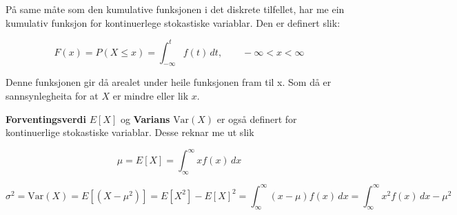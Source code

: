 På same måte som den kumulative funksjonen i det diskrete tilfellet, har me ein kumulativ funksjon for kontinuerlege stokastiske variablar. Den er definert slik:

\begin{equation}
    F(x) = P(X \leq x) = \int_{-\infty}^{t} f(t) \, dt, \qquad -\infty < x < \infty
\end{equation}

Denne funksjonen gir då arealet under heile funksjonen fram til x. Som då er sannsynlegheita for at $X$ er mindre eller lik $x$.

\textbf{Forventingsverdi} $E[X]$ og \textbf{Varians} $\text{Var}(X)$ er også definert for kontinuerlige stokastiske variablar. Desse reknar me ut slik

\begin{equation}
    \mu = E[X] = \int_{\infty}^{\infty} xf(x) \, dx
\end{equation}

\begin{equation}
    \sigma^2 = \text{Var}(X) = E[(X-\mu^2)] = E[X^2] - E[X]^2 = \int_{\infty}^{\infty} (x-\mu)f(x) \, dx = \int_{\infty}^{\infty} x^2 f(x) \, dx - \mu^2 
\end{equation}

